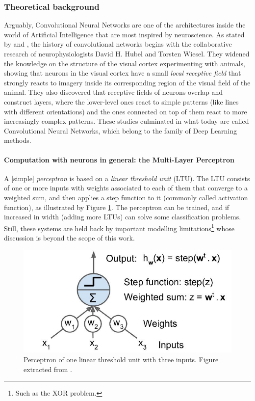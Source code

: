 \documentclass[../main.tex]{subfiles}
\begin{document}
\subsubsection{Theoretical background}
Arguably, Convolutional Neural Networks are one of the architectures inside the world of Artificial Intelligence that are most inspired by neuroscience. 
As stated by \cite{deep_learning_IGoodfellow} and \cite{hands_on_ML_Aurelien}, the history of convolutional networks begins with the collaborative research of neurophysiologists David H. Hubel and Torsten Wiesel. They widened the knowledge on the structure of the visual cortex experimenting with animals, showing that neurons in the visual cortex have a small \textit{local receptive field} that strongly reacts to imagery inside its corresponding region of the visual field of the animal. They also discovered that receptive fields of neurons overlap and construct layers, where the lower-level ones react to simple patterns (like lines with different orientations) and the ones connected on top of them react to more increasingly complex patterns. These studies culminated in what today are called Convolutional Neural Networks, which belong to the family of Deep Learning methods.

\paragraph{Computation with neurons in general: the Multi-Layer Perceptron}
A [simple] \textit{perceptron} is based on a \textit{linear threshold unit} (LTU). The LTU consists of one or more inputs with weights associated to each of them that converge to a weighted sum, and then applies a step function to it (commonly called activation function), as illustrated by Figure \ref{fig:simple_LTU}. The perceptron can be trained, and if increased in width (adding more LTUs) can solve some classification problems. Still, these systems are held back by important modelling limitations\footnote{Such as the XOR problem.} whose discussion is beyond the scope of this work.

\begin{figure}[H]
    \centering
    \includegraphics[width=0.7\linewidth]{images/simple_LTU.JPG}
    \caption{Perceptron of one linear threshold unit with three inputs. Figure extracted from \cite{hands_on_ML_Aurelien}.}
    \label{fig:simple_LTU}
\end{figure}
\end{document}
